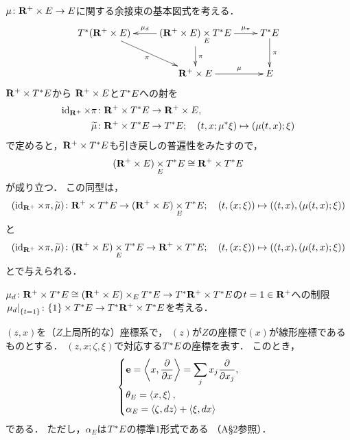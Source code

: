 \begin{CMT}
    \(\mu\colon \rrp\times E\to E\)に関する余接束の基本図式を考える．
    \[\vcenter{\xymatrix{
        \cotb[(\rrp\times E)]
        \ar[rd]_-{\pi}
        &
        (\rrp\times E)\pb[E]\cotb[E]
        \ar[l]_-{\mdiff[\mu]}
        \ar[r]^-{\mpb[\mu]}
        \ar[d]^-{\pi}
        &
        \cotb[E]
        \ar[d]^-{\pi}
        \\
        &
        \rrp\times E
        \ar[r]^-{\mu}
        &
        E
    }}\]
    \(\rrp\times \cotb[E]\)から
    \(\rrp\times E\)と\(\cotb[E]\)への射を
    \begin{align*}
        \id_{\rrp}\times\pi&\colon
        \rrp\times \cotb[E] \to\rrp\times E,\\
        \widetilde{\mu}&\colon
        \rrp\times \cotb[E] \to \cotb[E];
        \quad 
        (t,x;\mu^{\ast}\xi)\mapsto(\mu(t,x);\xi)
    \end{align*}
    で定めると，\(\rrp\times \cotb[E]\)も引き戻しの普遍性をみたすので，
    \[
        (\rrp\times E)\pb[E]\cotb[E]
        \cong
        \rrp\times \cotb[E]
    \]が成り立つ．
    この同型は，\[
        (\id_{\rrp}\times\pi,\widetilde{\mu})\colon
        \rrp\times \cotb[E]
        \to
        (\rrp\times E)\pb[E]\cotb[E];\quad
        \left(t,\left(x;\xi\right)\right)
        \mapsto
        ((t,x),(\mu(t,x);\xi))
    \]と\[
        (\id_{\rrp}\times\pi,\widetilde{\mu})\colon
        (\rrp\times E)\pb[E]\cotb[E]
        \to
        \rrp\times \cotb[E]
        ;\quad
        \left(t,\left(x;\xi\right)\right)
        \mapsto
        ((t,x),(\mu(t,x);\xi))
    \]とで与えられる．
    
    \(
        \mdiff[\mu]\colon
        \rrp\times \cotb[E]
        \cong
        (\rrp\times E)\times_{E}\cotb[E]
        \to
        \cotb[\rrp]\times\cotb[E]
    \)の\(t=1\in\rrp\)への制限\(
        \mres[{\mdiff[\mu]}]{\{t=1\}}
        \colon
        \{1\}\times \cotb[E]\to
        \cotb[\rrp]\times\cotb[E]
    \)を考える．
\end{CMT}

\((z,x)\)を（\(Z\)上局所的な）座標系で，
\((z)\)が\(Z\)の座標で\((x)\)が線形座標であるものとする．
\((z,x;\zeta,\xi)\)で対応する\(\cotb[E]\)の座標を表す．
このとき，
\begin{equation}
    \begin{dcases}
        \eu=\left\langle{x,\dfrac{\partial}{\partial{x}}}\right\rangle=\sum_{j}x_{j}\dfrac{\partial}{\partial{x_{j}}},\\
        \theta_{E}=\left\langle{x,\xi}\right\rangle,\\
        \alpha_{E}=\left\langle{\zeta,dz}\right\rangle+\left\langle{\xi,dx}\right\rangle
    \end{dcases}
\end{equation}
である．
ただし，\(\alpha_{E}\)は\(\cotb[E]\)の標準\(1\)形式である
（A\S2参照）．

